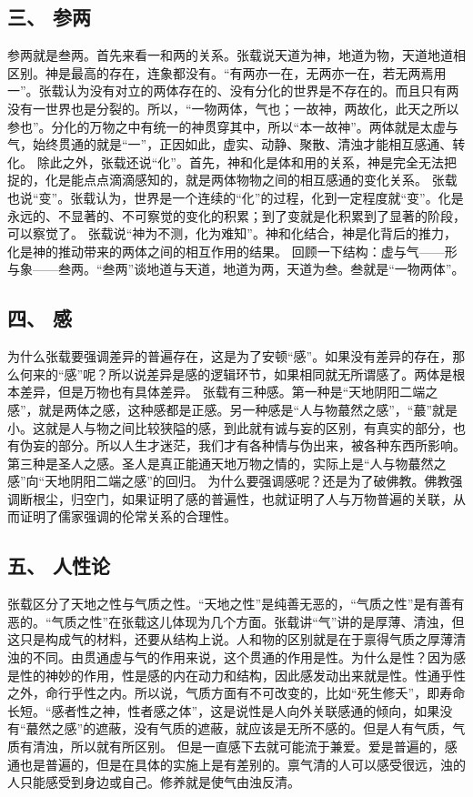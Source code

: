 \documentclass{article}
\begin{document}
\subsection{三、	参两}
参两就是叁两。首先来看一和两的关系。张载说天道为神，地道为物，天道地道相区别。神是最高的存在，连象都没有。“有两亦一在，无两亦一在，若无两焉用一”。张载认为没有对立的两体存在的、没有分化的世界是不存在的。而且只有两没有一世界也是分裂的。所以，“一物两体，气也；一故神，两故化，此天之所以参也”。分化的万物之中有统一的神贯穿其中，所以“本一故神”。两体就是太虚与气，始终贯通的就是“一”，正因如此，虚实、动静、聚散、清浊才能相互感通、转化。
除此之外，张载还说“化”。首先，神和化是体和用的关系，神是完全无法把捉的，化是能点点滴滴感知的，就是两体物物之间的相互感通的变化关系。
张载也说“变”。张载认为，世界是一个连续的“化”的过程，化到一定程度就“变”。化是永远的、不显著的、不可察觉的变化的积累；到了变就是化积累到了显著的阶段，可以察觉了。
张载说“神为不测，化为难知”。神和化结合，神是化背后的推力，化是神的推动带来的两体之间的相互作用的结果。
回顾一下结构：虚与气——形与象——叁两。“叁两”谈地道与天道，地道为两，天道为叁。叁就是“一物两体”。
\subsection{四、	感}
为什么张载要强调差异的普遍存在，这是为了安顿“感”。如果没有差异的存在，那么何来的“感”呢？所以说差异是感的逻辑环节，如果相同就无所谓感了。两体是根本差异，但是万物也有具体差异。
张载有三种感。第一种是“天地阴阳二端之感”，就是两体之感，这种感都是正感。另一种感是“人与物蕞然之感”，“蕞”就是小。这就是人与物之间比较狭隘的感，到此就有诚与妄的区别，有真实的部分，也有伪妄的部分。所以人生才迷茫，我们才有各种情与伪出来，被各种东西所影响。第三种是圣人之感。圣人是真正能通天地万物之情的，实际上是“人与物蕞然之感”向“天地阴阳二端之感”的回归。
为什么要强调感呢？还是为了破佛教。佛教强调断根尘，归空门，如果证明了感的普遍性，也就证明了人与万物普遍的关联，从而证明了儒家强调的伦常关系的合理性。
\subsection{五、	人性论}
张载区分了天地之性与气质之性。“天地之性”是纯善无恶的，“气质之性”是有善有恶的。“气质之性”在张载这儿体现为几个方面。张载讲“气”讲的是厚薄、清浊，但这只是构成气的材料，还要从结构上说。人和物的区别就是在于禀得气质之厚薄清浊的不同。由贯通虚与气的作用来说，这个贯通的作用是性。为什么是性？因为感是性的神妙的作用，性是感的内在动力和结构，因此感发动出来就是性。性通乎性之外，命行乎性之内。所以说，气质方面有不可改变的，比如“死生修夭”，即寿命长短。“感者性之神，性者感之体”，这是说性是人向外关联感通的倾向，如果没有“蕞然之感”的遮蔽，没有气质的遮蔽，就应该是无所不感的。但是人有气质，气质有清浊，所以就有所区别。
但是一直感下去就可能流于兼爱。爱是普遍的，感通也是普遍的，但是在具体的实施上是有差别的。禀气清的人可以感受很远，浊的人只能感受到身边或自己。修养就是使气由浊反清。
\end{document}
